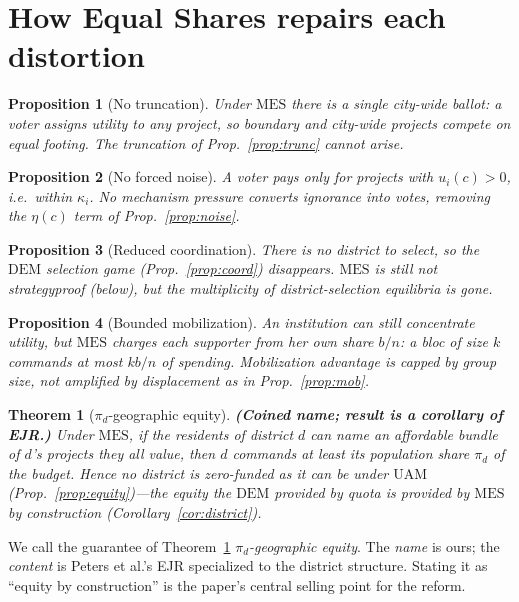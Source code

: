 \documentclass[11pt,letterpaper]{article}
\theoremstyle{definition}
\theoremstyle{plain}
\newtheorem{theorem}{Theorem}[section]
\newtheorem{proposition}{Proposition}[section]
\theoremstyle{remark}
\newcommand{\budget}{b}            %
\newcommand{\popshare}{\pi}        %
\newcommand{\DEM}{\mathrm{DEM}}
\newcommand{\UAM}{\mathrm{UAM}}
\newcommand{\MES}{\mathrm{MES}}
\begin{document}
\section{How Equal Shares repairs each distortion}
\label{sec:repair}

\begin{proposition}[No truncation]
Under $\MES$ there is a single city-wide ballot: a voter assigns utility to \emph{any} project, so
boundary and city-wide projects compete on equal footing. The truncation of
Prop.~\ref{prop:trunc} cannot arise.
\end{proposition}

\begin{proposition}[No forced noise]
A voter pays only for projects with $u_i(c)>0$, i.e.\ within $\kappa_i$. No mechanism pressure
converts ignorance into votes, removing the $\eta(c)$ term of Prop.~\ref{prop:noise}.
\end{proposition}

\begin{proposition}[Reduced coordination]
There is no district to select, so the $\DEM$ selection game (Prop.~\ref{prop:coord}) disappears.
$\MES$ is still not strategyproof (below), but the multiplicity of district-selection equilibria is
gone.
\end{proposition}

\begin{proposition}[Bounded mobilization]
An institution can still concentrate utility, but $\MES$ charges each supporter from her own share
$\budget/n$: a bloc of size $k$ commands at most $k\budget/n$ of spending. Mobilization advantage is
\emph{capped by group size}, not amplified by displacement as in Prop.~\ref{prop:mob}.
\end{proposition}

\begin{theorem}[$\popshare_d$-geographic equity]
\label{thm:geoequity}
\textbf{(Coined name; result is a corollary of EJR.)} Under $\MES$, if the residents of district
$d$ can name an affordable bundle of $d$'s projects they all value, then $d$ commands at least its
population share $\popshare_d$ of the budget. Hence no district is zero-funded as it can be under
$\UAM$ (Prop.~\ref{prop:equity})---the equity the $\DEM$ provided by quota is provided by $\MES$ by
construction (Corollary~\ref{cor:district}).
\end{theorem}

\begin{naming}
We call the guarantee of Theorem~\ref{thm:geoequity} \emph{$\popshare_d$-geographic equity}. The
\emph{name} is ours; the \emph{content} is Peters et al.'s EJR specialized to the district
structure. Stating it as ``equity by construction'' is the paper's central selling point for the
reform.
\end{naming}
\end{document}
